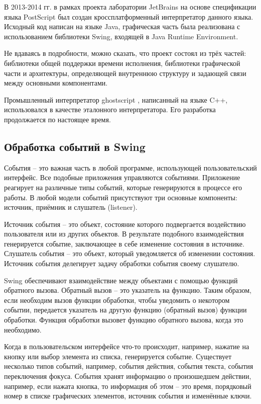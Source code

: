 \documentclass[14pt]{matmex-diploma}
\begin{document}
В 2013-2014 гг. в рамках проекта лаборатории JetBrains на основе спецификации языка PostScript был создан кроссплатформенный интерпретатор данного языка. Исходный код написан на языке Java, графическая часть была реализована с использованием библиотеки Swing, входящей в Java Runtime Environment.

Не вдаваясь в подробности, можно сказать, что проект состоял из трёх частей: библиотеки общей поддержки времени исполнения, библиотеки графической части и архитектуры, определяющей внутреннюю структуру и задающей связи между основными компонентами. 

Промышленный интерпретатор ghostscript \cite{wiki:ghostscript}, написанный на языке C++, использовался в качестве эталонного интерпретатора.  Его разработка продолжается по настоящее время.


\subsection{Обработка событий в Swing}

События -- это важная часть в любой программе, использующей пользовательский интерфейс. Все подобные приложения управляются событиями. Приложение реагирует на различные типы событий, которые генерируются в процессе его работы. В любой модели событий присутствуют три основные компоненты: источник, приёмник и слушатель (listener). 

Источник события -- это объект, состояние которого подвергается воздействию пользователя или из других объектов. В результате подобного взаимодействия генерируется событие, заключающее в себе изменение состояния в источнике. Слушатель события -- это объект, который уведомляется об изменении состояния. Источник события делегирует задачу обработки события своему слушателю.

Swing обеспечивают взаимодействие между объектами с помощью функций обратного вызова. Обратный вызов -- это указатель на функцию. Таким образом, если необходим вызов функции обработки, чтобы уведомить о некотором событии, передается указатель на другую функцию (обратный вызов) функции обработки. Функция обработки вызовет функцию обратного вызова, когда это необходимо.

Когда в пользовательском интерфейсе что-то происходит, например, нажатие на кнопку или выбор элемента из списка, генерируется событие. Существует несколько типов событий, например, события действия, события текста, события переключения фокуса. События хранят информацию о произошедшем действии, например, если нажата кнопка, то информация об этом -- это время, порядковый номер в списке графических элементов, источник события и изменённые ключи.
\end{document}
